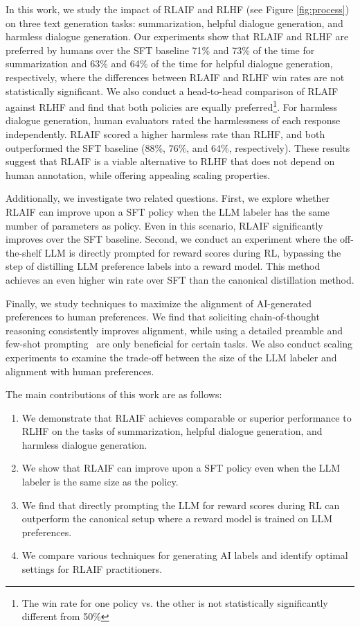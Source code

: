 \documentclass[11pt]{article}
\begin{document}
In this work, we study the impact of RLAIF and RLHF (see Figure \ref{fig:process}) on three text generation tasks: summarization, helpful dialogue generation, and harmless dialogue generation. Our experiments show that RLAIF and RLHF are preferred by humans over the SFT baseline 71\% and 73\% of the time for summarization and 63\% and 64\% of the time for helpful dialogue generation, respectively, where the differences between RLAIF and RLHF win rates are not statistically significant. We also conduct a head-to-head comparison of RLAIF against RLHF and find that both policies are equally preferred\footnote{The win rate for one policy vs. the other is not statistically significantly different from 50\%}. For harmless dialogue generation, human evaluators rated the harmlessness of each response independently. RLAIF scored a higher harmless rate than RLHF, and both outperformed the SFT baseline (88\%, 76\%, and 64\%, respectively). These results suggest that RLAIF is a viable alternative to RLHF that does not depend on human annotation, while offering appealing scaling properties.

Additionally, we investigate two related questions. First, we explore whether RLAIF can improve upon a SFT policy when the LLM labeler has the same number of parameters as policy. Even in this scenario, RLAIF significantly improves over the SFT baseline. Second, we conduct an experiment where the off-the-shelf LLM is directly prompted for reward scores during RL, bypassing the step of distilling LLM preference labels into a reward model. This method achieves an even higher win rate over SFT than the canonical distillation method.

Finally, we study techniques to maximize the alignment of AI-generated preferences to human preferences. We find that soliciting chain-of-thought reasoning \citep{wei2022chain} consistently improves alignment, while using a detailed preamble and few-shot prompting~\citep{brown2020language} are only beneficial for certain tasks. We also conduct scaling experiments to examine the trade-off between the size of the LLM labeler and alignment with human preferences.

The main contributions of this work are as follows:

\begin{enumerate}[noitemsep]
    \item We demonstrate that RLAIF achieves comparable or superior performance to RLHF on the tasks of summarization, helpful dialogue generation, and harmless dialogue generation.
    \item We show that RLAIF can improve upon a SFT policy even when the LLM labeler is the same size as the policy.
    \item We find that directly prompting the LLM for reward scores during RL can outperform the canonical setup where a reward model is trained on LLM preferences.
    \item We compare various techniques for generating AI labels and identify optimal settings for RLAIF practitioners.
\end{enumerate}
\end{document}
